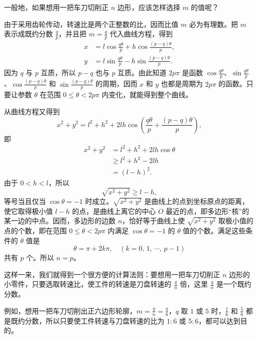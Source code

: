一般地，如果想用一把车刀切削正 $n$ 边形，应该怎样选择 $m$ 的值呢？

由于采用齿轮传动，转速比是两个正整数的比，因而比值 $m$ 必为有理数。把 $m$ 表示成既约分数 $\frac{q}{p}$，并且把 $m=\frac{q}{p}$ 代入曲线方程，得到
\begin{align*}
  x &= l\cos\frac{q\theta}{p} + h\cos\frac{(p-q)\theta}{p}, \\
  y &= l\sin\frac{q\theta}{p} - h\sin\frac{(p-q)\theta}{p}.
\end{align*}
因为 $q$ 与 $p$ 互质，所以 $p-q$ 也与 $p$ 互质。由此知道 $2p\pi$ 是函数 $\cos\frac{q\theta}{p}$、$\sin\frac{q\theta}{p}$、$\cos\frac{(p-q)\theta}{p}$ 和 $\sin\frac{(p-q)\theta}{p}$ 的周期，因而 $x$ 和 $y$ 也都是周期为 $2p\pi$ 的函数。只要让参数 $\theta$ 在范围 $0\leqslant\theta<2p\pi$ 内变化，就能得到整个曲线。

从曲线方程又得到
\[
  x^2+y^2 = l^2+h^2+2lh\cos\left(\frac{q\theta}{p}+\frac{(p-q)\theta}{p}\right),
\]
即
\begin{align*}
  x^2+y^2 &= l^2+h^2+2lh\cos\theta \\
          &\geqslant l^2+h^2-2lh \\
          &= (l-h)^2.
\end{align*}
由于 $0<h<l$，所以
\[
  \sqrt{x^2+y^2} \geqslant l-h,
\]
等号当且仅当 $\cos\theta=-1$ 时成立。$\sqrt{x^2+y^2}$ 是曲线上的点到坐标原点的距离，使它取得极小值 $l-h$ 的点，是曲线上离它的中心 $O$ 最近的点，即多边形“核”的某一边的中点。因而，多边形的边数 $n$，恰好等于曲线上使 $\sqrt{x^2+y^2}$ 取极小值的点的个数，即在范围 $0\leqslant\theta<2p\pi$ 内满足 $\cos\theta=-1$ 的 $\theta$ 值的个数。满足这些条件的 $\theta$ 值是
\[
  \theta = \pi + 2k\pi,\quad (k=0,\, 1,\, \cdots,\, p-1)
\]
共有 $p$ 个。所以 $n=p$。

这样一来，我们就得到一个很方便的计算法则：要想用一把车刀切削正 $n$ 边形的小零件，只要选取转速比，使工件的转速是刀盘转速的 $\frac{q}{n}$ 倍，这里 $\frac{q}{n}$ 是一个既约分数。

例如，想用一把车刀切削出正六边形轮廓，$m=\frac{q}{n}=\frac{q}{6}$，$q$ 取 $1$ 或 $5$ 时，$\frac{1}{6}$ 和 $\frac{5}{6}$ 都是既约分数，所以只要使工件转速与刀盘转速的比为 $1:6$ 或 $5:6$，都可以达到目的。
